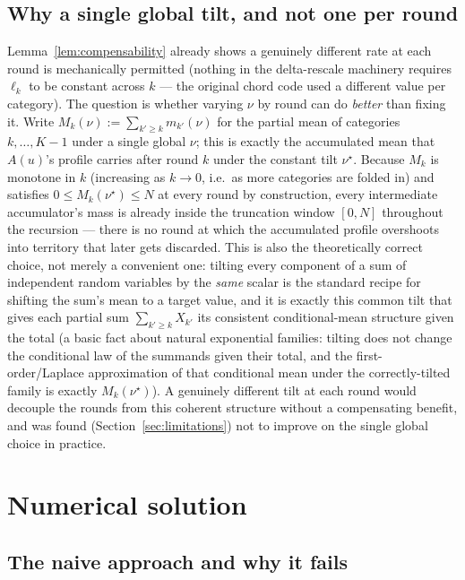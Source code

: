 \documentclass[11pt]{article}
\begin{document}
\subsection{Why a single global tilt, and not one per round}

Lemma~\ref{lem:compensability} already shows a genuinely different rate at each round
is mechanically permitted (nothing in the delta-rescale machinery requires $\ell_k$ to
be constant across $k$ --- the original chord code used a different value per category).
The question is whether varying $\nu$ by round can do \emph{better} than fixing it.
Write $M_k(\nu) := \sum_{k'\ge k} m_{k'}(\nu)$ for the partial mean of categories
$k,\dots,K-1$ under a single global $\nu$; this is exactly the accumulated mean that
$A(u)$'s profile carries after round $k$ under the constant tilt $\nu^\star$. Because
$M_k$ is monotone in $k$ (increasing as $k\to0$, i.e.\ as more categories are folded
in) and satisfies $0\le M_k(\nu^\star)\le N$ at every round by construction, every
intermediate accumulator's mass is already inside the truncation window
$[0,N]$ throughout the recursion --- there is no round at which the accumulated profile
overshoots into territory that later gets discarded. This is also the theoretically
correct choice, not merely a convenient one: tilting every component of a sum of
independent random variables by the \emph{same} scalar is the standard recipe for
shifting the sum's mean to a target value, and it is exactly this common tilt that
gives each partial sum $\sum_{k'\ge k} X_{k'}$ its consistent conditional-mean
structure given the total (a basic fact about natural exponential families: tilting
does not change the conditional law of the summands given their total, and the
first-order/Laplace approximation of that conditional mean under the correctly-tilted
family is exactly $M_k(\nu^\star)$). A genuinely different tilt at each round would
decouple the rounds from this coherent structure without a compensating benefit, and
was found (Section~\ref{sec:limitations}) not to improve on the single global choice in
practice.

\section{Numerical solution}
\label{sec:numerics}

\subsection{The naive approach and why it fails}
\end{document}
